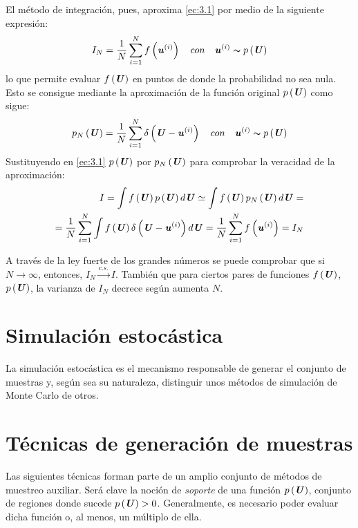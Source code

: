 El método de integración, pues, aproxima \ref{ec:3.1} por medio de la siguiente expresión:
\begin{equation}
    I_{N} = \frac{1}{N} \sum_{i=1}^{N} f\left(\textbf{\textit{u}}^{(i)}\right) \quad con \quad \textbf{\textit{u}}^{(i)} \thicksim p\left(\textbf{\textit{U}}\right) \label{ec:3.2}
\end{equation}
lo que permite evaluar $f\left(\textbf{\textit{U}}\right)$ en puntos de \cjtoVarAl donde la probabilidad no sea nula. Esto se consigue mediante la aproximación de la función original $p\left(\textbf{\textit{U}}\right)$  como sigue:
\begin{equation}
    p_{N}\left(\textbf{\textit{U}}\right) = \frac{1}{N}\sum_{i=1}^{N}\delta\left(\textbf{\textit{U}} - \textbf{\textit{u}}^{(i)}\right) \quad con \quad \textbf{\textit{u}}^{(i)} \thicksim p\left(\textbf{\textit{U}}\right)
    \label{ec:3.3}
\end{equation}
Sustituyendo en \ref{ec:3.1} $p\left(\textbf{\textit{U}}\right)$ por $p_{N}\left(\textbf{\textit{U}}\right)$  para comprobar la veracidad de la aproximación:
\begin{equation*}
\begin{split}
    I = \int f\left(\textbf{\textit{U}}\right)p\left(\textbf{\textit{U}}\right)d\textbf{\textit{U}} \simeq
        \int f\left(\textbf{\textit{U}}\right)p_{N}\left(\textbf{\textit{U}}\right)d\textbf{\textit{U}} = \\
        = \frac{1}{N}\sum_{i=1}^{N} \int f\left(\textbf{\textit{U}}\right)\delta\left(\textbf{\textit{U}} - \textbf{\textit{u}}^{(i)}\right)d\textbf{\textit{U}} = \frac{1}{N}\sum_{i=1}^{N}f\left({\textbf{\textit{u}}^{(i)}}\right) = I_{N}
\end{split}
\end{equation*}

A través de la ley fuerte de los grandes números se puede comprobar que si $N \rightarrow \infty$, entonces, $I_{N}\xrightarrow{c.s.}I$. También que para ciertos pares de funciones $f\left(\textbf{\textit{U}}\right)$, $p\left(\textbf{\textit{U}}\right)$, la varianza de $I_{N}$ decrece  según aumenta $N$.

\section{Simulación estocástica}
La simulación estocástica es el mecanismo responsable de generar el conjunto de muestras y, según sea su naturaleza, distinguir unos métodos de simulación de Monte Carlo de otros.

\section{Técnicas de generación de muestras}
Las siguientes técnicas forman parte de un amplio conjunto de métodos de muestreo auxiliar. Será clave la noción de \textit{soporte} de una función $p\left(\textbf{\textit{U}}\right)$, conjunto de regiones donde sucede $p\left(\textbf{\textit{U}}\right) > 0$. Generalmente, es necesario poder evaluar dicha función o, al menos, un múltiplo de ella.

